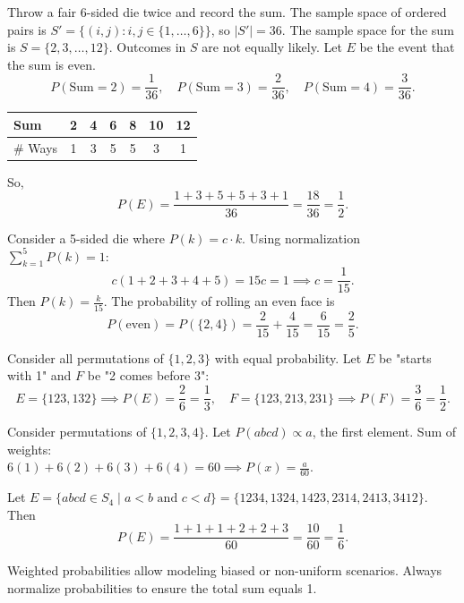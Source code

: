 \begin{eg}
Throw a fair 6-sided die twice and record the sum. The sample space of ordered pairs is $S' = \{(i,j) : i,j \in \{1,\dots,6\}\}$, so $|S'| = 36$. The sample space for the sum is $S = \{2, 3, \dots, 12\}$. Outcomes in $S$ are not equally likely. Let $E$ be the event that the sum is even.
\[
P(\text{Sum}=2) = \frac{1}{36}, \quad 
P(\text{Sum}=3) = \frac{2}{36}, \quad 
P(\text{Sum}=4) = \frac{3}{36}.
\]

\begin{center}
\begin{tabular}{lcccccc}
\toprule
Sum & 2 & 4 & 6 & 8 & 10 & 12 \\
\midrule
\# Ways & 1 & 3 & 5 & 5 & 3 & 1 \\
\bottomrule
\end{tabular}
\end{center}

So, 
\[
P(E) = \frac{1+3+5+5+3+1}{36} = \frac{18}{36} = \frac{1}{2}.
\]
\end{eg}

\begin{eg}
Consider a 5-sided die where $P(k) = c \cdot k$. Using normalization $\sum_{k=1}^{5} P(k) = 1$:
\[
c(1+2+3+4+5) = 15c = 1 \implies c = \frac{1}{15}.
\]
Then $P(k) = \frac{k}{15}$. The probability of rolling an even face is
\[
P(\text{even}) = P(\{2,4\}) = \frac{2}{15} + \frac{4}{15} = \frac{6}{15} = \frac{2}{5}.
\]
\end{eg}

\begin{eg}[Permutations]
Consider all permutations of $\{1,2,3\}$ with equal probability. Let $E$ be "starts with 1" and $F$ be "2 comes before 3":
\[
E = \{123, 132\} \implies P(E) = \frac{2}{6} = \frac{1}{3}, \quad 
F = \{123, 213, 231\} \implies P(F) = \frac{3}{6} = \frac{1}{2}.
\]
\end{eg}

\begin{eg}
Consider permutations of $\{1,2,3,4\}$. Let $P(abcd) \propto a$, the first element. Sum of weights: \\ 
$6(1)+6(2)+6(3)+6(4) = 60 \implies P(x) = \frac{a}{60}$.  

Let $E = \{abcd \in S_4 \mid a<b \text{ and } c<d\} = \{1234, 1324, 1423, 2314, 2413, 3412\}$. Then
\[
P(E) = \frac{1+1+1+2+2+3}{60} = \frac{10}{60} = \frac{1}{6}.
\]
\end{eg}

\begin{remark}
Weighted probabilities allow modeling biased or non-uniform scenarios. Always normalize probabilities to ensure the total sum equals 1.
\end{remark}
